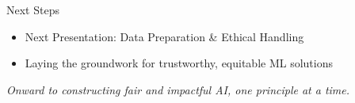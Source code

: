 \documentclass[aspectratio=169]{beamer}
\begin{document}
%
%
\begin{frame}{Next Steps}
\begin{itemize}
\item Next Presentation: Data Preparation \& Ethical Handling
\item Laying the groundwork for trustworthy, equitable ML solutions
\end{itemize}

\vspace{0.8em}
\emph{Onward to constructing fair and impactful AI, one principle at a time.}
\end{frame}
\end{document}
